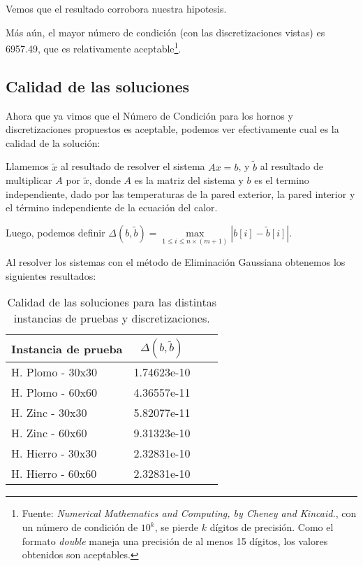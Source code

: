 Vemos que el resultado corrobora nuestra hipotesis.

Más aún, el mayor número de condición (con las discretizaciones vistas) es 6957.49, que es relativamente aceptable\footnote{Fuente: \textit{Numerical Mathematics and Computing, by Cheney and Kincaid.}, con un número de condición de $10^k$, se pierde $k$ dígitos de precisión. Como el formato \textit{double} maneja una precisión de al menos 15 dígitos, los valores obtenidos son aceptables.}.

\subsection{Calidad de las soluciones}

Ahora que ya vimos que el Número de Condición para los hornos y discretizaciones propuestos es aceptable, podemos ver efectivamente cual es la calidad de la solución:

Llamemos $\tilde{x}$ al resultado de resolver el sistema $Ax = b$, y $\tilde{b}$ al resultado de multiplicar $A$ por $\tilde{x}$, donde $A$ es la matriz del sistema y $b$ es el termino independiente, dado por las temperaturas de la pared exterior, la pared interior y el término independiente de la ecuación del calor.

\medskip

Luego, podemos definir $\Delta(b, \tilde{b}) = \max\limits_{1 \leq i \leq n\times(m+1)}|b[i] - \tilde{b}[i]|$.

Al resolver los sistemas con el método de Eliminación Gaussiana obtenemos los siguientes resultados:

\begin{table}[H]
    \begin{center}
        \begin{tabular}{| l | c | c | c |}
            \hline
            Instancia de prueba & $\Delta(b, \tilde{b})$ \\ \hline
            H. Plomo - 30x30    & 1.74623e-10            \\
            H. Plomo - 60x60    & 4.36557e-11            \\
            H. Zinc - 30x30     & 5.82077e-11            \\
            H. Zinc - 60x60     & 9.31323e-10            \\
            H. Hierro - 30x30   & 2.32831e-10            \\
            H. Hierro - 60x60   & 2.32831e-10            \\
            \hline
        \end{tabular}
        \captionsetup{justification=centering}
        \caption{Calidad de las soluciones para las distintas instancias de pruebas y discretizaciones.}
    \end{center}
\end{table}

